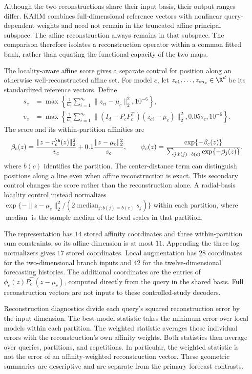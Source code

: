 Although the two reconstructions share their input basis, their output
ranges differ. KAHM combines full-dimensional reference vectors with
nonlinear query-dependent weights and need not remain in the truncated
affine principal subspace. The affine reconstruction always remains in
that subspace. The comparison therefore isolates a reconstruction
operator within a common fitted bank, rather than equating the functional
capacity of the two maps.

The locality-aware affine score gives a separate control for position
along an otherwise well-reconstructed affine set. For model $c$, let
$z_{c1},\ldots,z_{cn_c}\in\R^d$ be its standardized reference vectors.
Define
\begin{align*}
 s_c&=\max\left\{\frac1{n_c}\sum_{i=1}^{n_c}
       \|z_{ci}-\mu_c\|_2^2,10^{-6}\right\},\\
 v_c&=\max\left\{\frac1{n_c}\sum_{i=1}^{n_c}
       \|(I_d-P_cP_c^\top)(z_{ci}-\mu_c)\|_2^2,
       0.05s_c,10^{-6}\right\}.
\end{align*}
The score and its within-partition affinities are
\[
 \beta_c(z)=\frac{\|z-r_c^{\A}(z)\|_2^2}{v_c}
             +0.1\frac{\|z-\mu_c\|_2^2}{s_c},\qquad
 \psi_c(z)=\frac{\exp\{-\beta_c(z)\}}
 {\sum_{j:b(j)=b(c)}\exp\{-\beta_j(z)\}},
\]
where $b(c)$ identifies the partition. The center-distance term can
distinguish positions along a line even when affine reconstruction is
exact. This secondary control changes the score rather than the
reconstruction alone. A radial-basis locality control instead normalizes
$\exp\{-\|z-\mu_c\|_2^2/(2\operatorname{median}_{j:b(j)=b(c)}s_j)\}$
within each partition, where $\operatorname{median}$ is the sample median
of the local scales in that partition.

The representation has $14$ stored affinity coordinates and three
within-partition sum constraints, so its affine dimension is at most
$11$. Appending the three log normalizers gives $17$ stored coordinates.
Local augmentation has $28$ coordinates for the two-dimensional branch
inputs and $42$ for the twelve-dimensional forecasting histories.
The additional coordinates are the entries of
$\phi_c(z)P_c^\top(z-\mu_c)$, computed directly from the query in the
shared basis. Full reconstruction vectors are not inputs to these
controlled-study decoders.

Reconstruction diagnostics divide each query's squared reconstruction
error by the input dimension. The best-model statistic takes the minimum
error over local models within each partition. The weighted statistic
averages those individual errors with the reconstruction's own affinity
weights. Both statistics then average over queries, partitions, and
repetitions. In particular, the weighted statistic is not the error of
an affinity-weighted reconstruction vector. These geometric summaries
are descriptive and are separate from the primary forecast contrasts.

